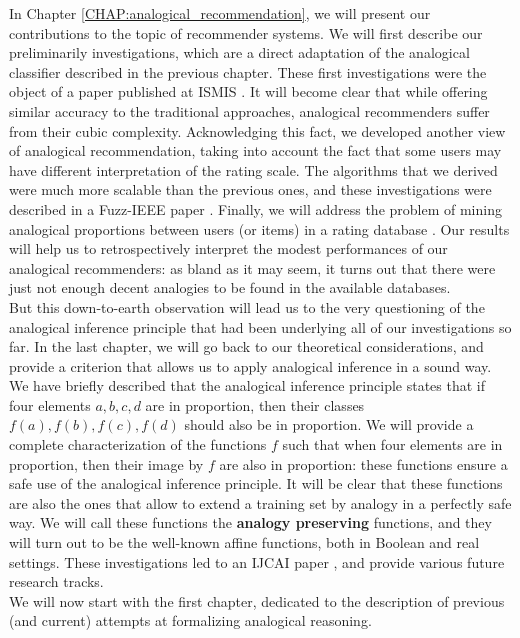 In Chapter \ref{CHAP:analogical_recommendation}, we will present our
contributions to the topic of recommender systems. We will first describe our
preliminarily investigations, which are a direct adaptation of the analogical
classifier described in the previous chapter. These first investigations were
the object of a paper published at ISMIS \cite{HugPraRicISMIS15}. It will
become clear that while offering similar accuracy to the traditional
approaches, analogical recommenders suffer from their cubic complexity.
Acknowledging this fact, we developed another view of analogical
recommendation, taking into account the fact that some users may have different
interpretation of the rating scale. The algorithms that we derived were much
more scalable than the previous ones, and these investigations were described
in a Fuzz-IEEE paper \cite{HugPraRicSerFuzzIEEE16}.  Finally, we will address
the problem of mining analogical proportions between users (or items) in a
rating database \cite{HugPraRicSerLFA16}. Our results will help us to
retrospectively interpret the modest performances of our analogical
recommenders: as bland as it may seem, it turns out that there were just not
enough decent analogies to be found in the available databases.\\

But this down-to-earth observation will lead us to the very questioning of
the analogical inference principle that had been underlying all of our
investigations so far. In the last chapter, we will go back to our theoretical
considerations, and provide a criterion that allows us to apply analogical
inference in a sound way. We have briefly described that the analogical
inference principle states that if four elements $a, b, c, d$ are in
proportion, then their classes $f(a), f(b), f(c), f(d)$ should also be in
proportion. We will provide a complete characterization of the functions $f$
such that when four elements are in proportion, then their image by $f$ are
also in proportion: these functions ensure a safe use of the analogical
inference principle. It will be clear that these functions are also the ones
that allow to extend a training set by analogy in a perfectly safe way. We will
call these functions the \textbf{analogy preserving} functions, and they will
turn out to be the well-known affine functions, both in Boolean and real
settings. These investigations led to an IJCAI paper
\cite{CouHugPraRicIJCAI17}, and provide various future research tracks.\\


We will now start with the first chapter, dedicated to the description of
previous (and current) attempts at formalizing analogical reasoning.
